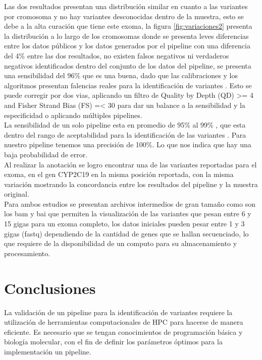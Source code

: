 Las dos resultados presentan una distribución similar en cuanto a las variantes por cromosoma y no hay variantes desconocidas dentro de la muestra, esto se debe a la alta curación que tiene este exoma, la figura \ref{fig:variaciones2} presenta la distribución a lo largo de los cromosomas donde se presenta leves diferencias entre los datos públicos y los datos generados por el pipeline con una diferencia del 4\% entre las dos resultados, no existen falsos negativos ni verdaderos negativos identificados dentro del conjunto de los datos del pipeline, se presenta una sensibilidad del 96\% que es una buena, dado que las calibraciones y los algoritmos presentan falencias reales para la identificación de variantes \cite{Auwera2014}. Esto se puede corregir por dos vias, aplicando un filtro de Quality by Depth (QD) >= 4 and Fisher Strand Bias (FS) =< 30 para dar un balance  a la sensibilidad y la especificidad \cite{Tsai2016} o aplicando múltiples pipelines. \\


La sensibilidad de un solo pipeline esta en promedio de 95\% al 99\% , que esta dentro del rango de aceptabilidad para la identificación de las variantes \cite{Liu2013}. Para nuestro pipeline tenemos una precisión de 100\%. Lo que nos indica que hay  una baja probabilidad de error. \\

Al realizar la anotación se logro encontrar una de las variantes reportadas para el exoma, en el gen CYP2C19 en la misma posición reportada, con la misma variación mostrando la concordancia entre los resultados del pipeline y la muestra original. \\

Para ambos estudios se presentan archivos intermedios de gran tamaño como son los bam y bai que permiten la visualización de las variantes que pesan entre 6 y 15 gigas para un exoma completo, los datos iniciales pueden pesar entre 1 y 3 gigas (fastq) dependiendo de la cantidad de genes que se hallan secuenciado, lo que requiere de la disponibilidad de un computo para su almacenamiento y procesamiento. 

\section{Conclusiones}

La validación de un pipeline para la identificación de variantes requiere la utilización de herramientas computacionales de HPC para hacerse de manera eficiente. Es necesario que se tengan conocimientos de programación básica y biología molecular, con el fin de definir los parámetros óptimos para la implementación un pipeline. \\ 

